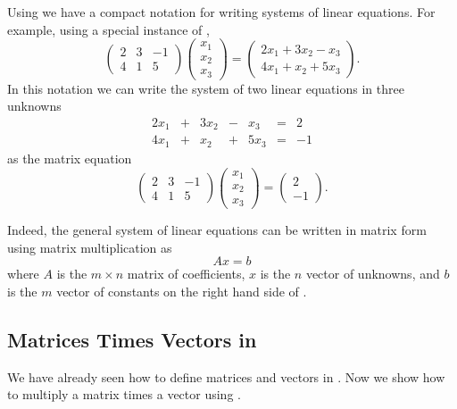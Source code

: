 \documentclass{ximera}
\begin{document}
Using  we have a compact notation for writing
systems of linear equations.  For example, using a special
instance of ,
\[
\left(
\begin{array}{rrr}
 2  & 3 & -1 \\
 4  & 1 &  5
\end{array}
\right)
\left(
\begin{array}{r}
x_1 \\ x_2 \\ x_3
\end{array}
\right)
=
\left(
\begin{array}{c}
2x_1 + 3x_2 - x_3 \\
4x_1 + x_2 + 5x_3
\end{array}
\right).
\]
In this notation we can write the system of two linear equations
in three unknowns
\[
\begin{array}{ccccccr}
2x_1 & + & 3x_2 & - &  x_3 & = &   2 \\
4x_1 & + &  x_2 & + & 5x_3 & = &  -1
\end{array}
\]
as the matrix equation
\[
\left(
\begin{array}{rrr}
 2  & 3 & -1 \\
 4  & 1 &  5
\end{array}
\right)
\left(
\begin{array}{r}
x_1 \\ x_2 \\ x_3
\end{array}
\right)
=
\left(
\begin{array}{r}
2 \\ -1
\end{array}
\right).
\]

Indeed, the general system of linear equations 
can be written in matrix form using matrix multiplication as
\[
Ax=b
\]
where $A$ is the $m\times n$ matrix of coefficients, $x$ is the
$n$ vector of unknowns, and $b$ is the $m$ vector of constants
on the right hand side of .


\subsection*{Matrices Times Vectors in \Matlab}

We have already seen how to define matrices and vectors in
\Matlabp.  Now we show how to multiply a matrix times a vector
using \Matlabp{}.
\end{document}
